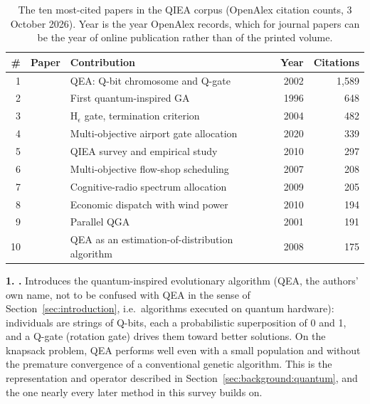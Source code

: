 \begin{table}[H]
  \centering
  \small
  \caption{The ten most-cited papers in the QIEA corpus (OpenAlex
    citation counts, 3 October 2026). Year is the year OpenAlex
    records, which for journal papers can be the year of online
    publication rather than of the printed volume.}
  \label{tab:bibliometric-top-cited}
  \begin{tabularx}{\linewidth}{@{}rlXrr@{}}
    \toprule
    \# & Paper & Contribution & Year & Citations \\
    \midrule
    1 & \citet{han2002qea} & QEA: Q-bit chromosome and Q-gate & 2002 & 1{,}589 \\
    2 & \citet{narayanan1996qiga} & First quantum-inspired GA & 1996 & 648 \\
    3 & \citet{han2004hepsilon} & H$_\epsilon$ gate, termination criterion & 2004 & 482 \\
    4 & \citet{deng2020gate} & Multi-objective airport gate allocation & 2020 & 339 \\
    5 & \citet{zhang2011qieasurvey} & QIEA survey and empirical study & 2010 & 297 \\
    6 & \citet{li2007hqga} & Multi-objective flow-shop scheduling & 2007 & 208 \\
    7 & \citet{zhao2009cognitive} & Cognitive-radio spectrum allocation & 2009 & 205 \\
    8 & \citet{lee2011qgadispatch} & Economic dispatch with wind power & 2010 & 194 \\
    9 & \citet{han2001pqga} & Parallel QGA & 2001 & 191 \\
    10 & \citet{platel2009qeaeda} & QEA as an estimation-of-distribution algorithm & 2008 & 175 \\
    \bottomrule
  \end{tabularx}
\end{table}

\textbf{1. \citet{han2002qea}.} Introduces the quantum-inspired
evolutionary algorithm (QEA, the authors' own name, not to be confused
with QEA in the sense of Section~\ref{sec:introduction}, i.e.\
algorithms executed on quantum hardware): individuals are strings of Q-bits, each a
probabilistic superposition of 0 and 1, and a Q-gate (rotation gate)
drives them toward better solutions. On the knapsack problem, QEA
performs well even with a small population and without the premature
convergence of a conventional genetic algorithm. This is the
representation and operator described in
Section~\ref{sec:background:quantum}, and the one nearly every later
method in this survey builds on.

